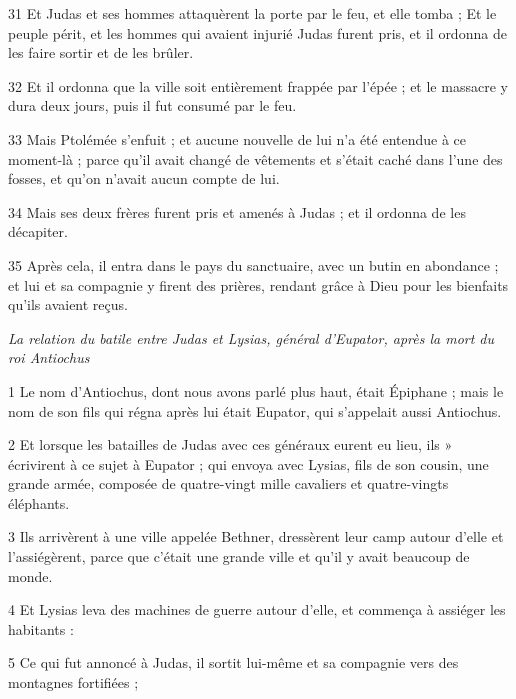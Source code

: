 \par 31 Et Judas et ses hommes attaquèrent la porte par le feu, et elle tomba ; Et le peuple périt, et les hommes qui avaient injurié Judas furent pris, et il ordonna de les faire sortir et de les brûler.

\par 32 Et il ordonna que la ville soit entièrement frappée par l'épée ; et le massacre y dura deux jours, puis il fut consumé par le feu.

\par 33 Mais Ptolémée s'enfuit ; et aucune nouvelle de lui n'a été entendue à ce moment-là ; parce qu'il avait changé de vêtements et s'était caché dans l'une des fosses, et qu'on n'avait aucun compte de lui.

\par 34 Mais ses deux frères furent pris et amenés à Judas ; et il ordonna de les décapiter.

\par 35 Après cela, il entra dans le pays du sanctuaire, avec un butin en abondance ; et lui et sa compagnie y firent des prières, rendant grâce à Dieu pour les bienfaits qu'ils avaient reçus.



\par \textit{La relation du batile entre Judas et Lysias, général d'Eupator, après la mort du roi Antiochus}

\par 1 Le nom d'Antiochus, dont nous avons parlé plus haut, était Épiphane ; mais le nom de son fils qui régna après lui était Eupator, qui s'appelait aussi Antiochus.

\par 2 Et lorsque les batailles de Judas avec ces généraux eurent eu lieu, ils » écrivirent à ce sujet à Eupator ; qui envoya avec Lysias, fils de son cousin, une grande armée, composée de quatre-vingt mille cavaliers et quatre-vingts éléphants.

\par 3 Ils arrivèrent à une ville appelée Bethner, dressèrent leur camp autour d'elle et l'assiégèrent, parce que c'était une grande ville et qu'il y avait beaucoup de monde.

\par 4 Et Lysias leva des machines de guerre autour d'elle, et commença à assiéger les habitants :

\par 5 Ce qui fut annoncé à Judas, il sortit lui-même et sa compagnie vers des montagnes fortifiées ;

